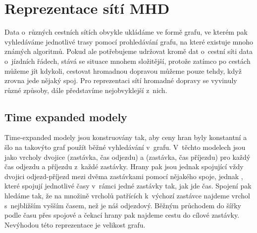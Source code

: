 \chapter{Reprezentace sítí MHD}
Data o~různých cestních sítích obvykle ukládáme ve formě grafu, ve kterém pak
vyhledáváme jednotlivé trasy pomocí prohledávání grafu, na které existuje mnoho
známých algoritmů. Pokud ale potřebujeme udržovat kromě dat o~cestní síti data
o~jízdních řádech, stává se situace mnohem složitější, protože zatímco po cestách
můžeme jít kdykoli, cestovat hromadnou dopravou můžeme pouze tehdy, když zrovna
jede nějaký spoj. Pro reprezentaci sítí hromadné dopravy se vyvinuly různé
způsoby, dále představíme nejobvyklejší z~nich.

\section{Time expanded modely}
Time-expanded modely\cite{time-expanded} jsou konstruovány tak, aby ceny hran
byly konstantní a šlo na takovýto graf použít běžné vyhledávání v~grafu.
V~těchto modelech jsou jako vrcholy dvojice (zastávka, čas odjezdu) a (zastávka,
čas příjezdu) pro každý čas odjezdu a příjezdu z~každé zastávky. Hrany pak
jsou jednak  spojující vždy dvojici odjezd-příjezd mezi dvěma
zastávkami pomocí nějakého spoje, jednak , které spojují jednotlivé
časy v~rámci jedné zastávky tak, jak jde čas. Spojení pak hledáme tak, že na
množině vrcholů patřících k~výchozí zastávce najdeme vrchol s~nejbližším vyšším
časem, než je náš odjezdový. Běžným průchodem do šířky podle času přes spojové a
čekací hrany pak najdeme cestu do cílové zastávky. Nevýhodou této reprezentace
je velikost grafu.

